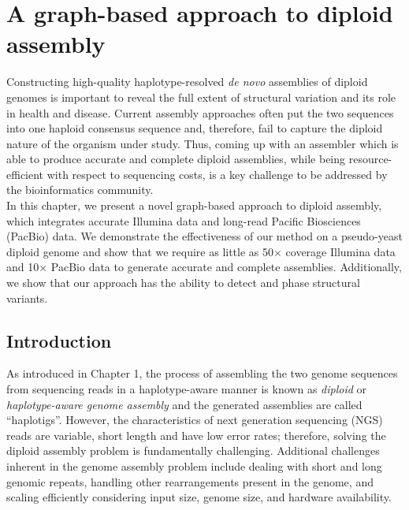 \chapter{A graph-based approach to diploid assembly}
Constructing high-quality haplotype-resolved \textit{de novo} assemblies of diploid genomes is important to reveal the full extent of structural variation and its role in health and disease.
Current assembly approaches often put the two sequences into one haploid consensus sequence and, therefore, fail to capture the diploid nature of the organism under study.
Thus, coming up with an assembler which is able to produce accurate and complete diploid assemblies, while being resource-efficient with respect to sequencing costs, 
is a key challenge to be addressed by the bioinformatics community.\\

In this chapter, we present a novel graph-based approach to diploid assembly, which integrates accurate Illumina data and long-read Pacific Biosciences (PacBio) data.
We demonstrate the effectiveness of our method on a pseudo-yeast diploid genome and show that we require as little as 50$\times$ coverage Illumina data 
and 10$\times$ PacBio data to generate accurate and complete assemblies.
Additionally, we show that our approach has the ability to detect and phase structural variants.\\


\section{Introduction}
As introduced in Chapter 1, the process of assembling the two genome sequences from sequencing reads in a haplotype-aware manner is known as \textit{diploid} or \textit{haplotype-aware genome assembly} and the generated assemblies are called ``haplotigs''.
However, the characteristics of next generation sequencing (NGS) reads are variable, short length and have low error rates; therefore, solving the diploid assembly problem is fundamentally challenging.
Additional challenges inherent in the genome assembly problem include dealing with short and long genomic repeats, handling other rearrangements present in the genome, and scaling efficiently considering input size, genome size, and hardware availability.

